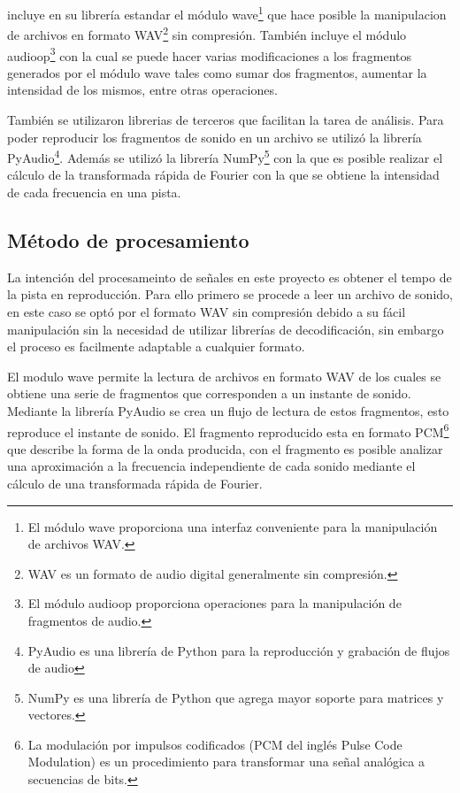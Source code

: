  incluye en su librer\'ia estandar el m\'odulo {\sc wave}\footnote{El m\'odulo {\sc wave} proporciona una interfaz conveniente para la manipulaci\'on de archivos WAV.} que hace posible la manipulacion de archivos en formato WAV\footnote{WAV es un formato de audio digital generalmente sin compresi\'on.} sin compresi\'on. Tambi\'en incluye el m\'odulo {\sc audioop}\footnote{El m\'odulo {\sc audioop} proporciona operaciones para la manipulaci\'on de fragmentos de audio.} con la cual se puede hacer varias modificaciones a los fragmentos generados por el m\'odulo {\sc wave} tales como sumar dos fragmentos, aumentar la intensidad de los mismos, entre otras operaciones.                        

\noindent Tambi\'en se utilizaron librerias de terceros que facilitan la tarea de an\'alisis. Para poder reproducir los fragmentos de sonido en un archivo se utiliz\'o la librer\'ia {\sc PyAudio}\footnote{{\sc PyAudio} es una librer\'ia de {\sc Python} para la reproducci\'on y grabaci\'on de flujos de audio}. Adem\'as se utiliz\'o la librer\'ia {\sc NumPy}\footnote{{\sc NumPy} es una librer\'ia de {\sc Python} que agrega mayor soporte para matrices y vectores.} con la que es posible realizar el c\'alculo de la transformada r\'apida de Fourier con la que se obtiene la intensidad de cada frecuencia en una pista.

\subsection{M\'etodo de procesamiento}

La intenci\'on del procesameinto de se\~nales en este proyecto es obtener el tempo de la pista en reproducci\'on. Para ello primero se procede a leer un archivo de sonido, en este caso se opt\'o por el formato WAV sin compresi\'on debido a su f\'acil manipulaci\'on sin la necesidad de utilizar librer\'ias de decodificaci\'on, sin embargo el proceso es facilmente adaptable a cualquier formato.

\noindent El modulo {\sc wave} permite la lectura de archivos en formato WAV de los cuales se obtiene una serie de fragmentos que corresponden a un instante de sonido. Mediante la librer\'ia {\sc PyAudio} se crea un flujo de lectura de estos fragmentos, esto reproduce el instante de sonido. El fragmento reproducido esta en formato PCM\footnote{La modulaci\'on por impulsos codificados (PCM del ingl\'es Pulse Code Modulation) es un procedimiento para transformar una se\~nal anal\'ogica a secuencias de bits.}  que describe la forma de la onda producida, con el fragmento es posible analizar una aproximaci\'on a la frecuencia independiente de cada sonido mediante el c\'alculo de una transformada r\'apida de Fourier.

